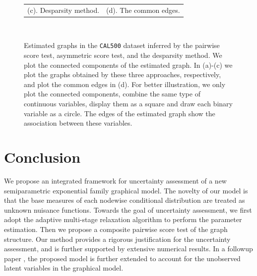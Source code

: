 \documentclass[twoside,11pt]{article}
\begin{document}
\begin{figure}[h!]
\begin{tabular}{cc}
\hskip-30pt (c). Desparsity method. &(d). The common edges.\\
\end{tabular}\\
\caption{Estimated graphs in the \texttt{CAL500} dataset inferred by the pairwise score test, asymmetric score test, and the desparsity method. We plot the connected components of the estimated graph. In (a)-(c) we plot the graphs obtained by these three approaches, respectively, and plot the common edges in (d). For better illustration, we only plot the connected components,  combine the same type of continuous variables, display them as a square and draw each binary variable as a circle. The edges of the estimated graph show the association between these variables. }
\label{fig::real_data}
\end{figure}


 

 
\section{Conclusion}\label{sec::conclusion}
We propose an integrated framework for uncertainty assessment of a new  semiparametric exponential family graphical model. The novelty of our model is that the base measures  of each nodewise conditional distribution are treated as unknown nuisance functions. Towards the goal of uncertainty assessment, we first adopt the adaptive multi-stage relaxation algorithm to perform the parameter estimation. Then we propose a composite pairwise score test of the graph structure. 
Our method provides a rigorous justification for the uncertainty assessment, and is further supported by extensive numerical results. In a followup paper \citep{tan2016replicates}, the proposed model is further extended to account for the unobserved latent variables in the graphical model. 



















\end{document}
